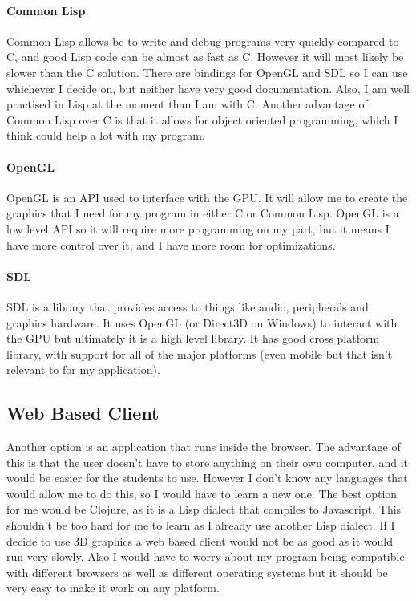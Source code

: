 \paragraph{Common Lisp} 
Common Lisp allows be to write and debug programs very quickly compared to C,
and good Lisp code can be almost as fast as C. However it will most likely be
slower than the C solution. There are bindings for OpenGL and SDL so I can use
whichever I decide on, but neither have very good documentation. Also, I am well
practised in Lisp at the moment than I am with C. Another advantage of Common
Lisp over C is that it allows for object oriented programming, which I think
could help a lot with my program.

\paragraph{OpenGL}
OpenGL is an API used to interface with the GPU. It will allow me to create the
graphics that I need for my program in either C or Common Lisp. OpenGL is a low
level API so it will require more programming on my part, but it means I have
more control over it, and I have more room for optimizations.

\paragraph{SDL}
SDL is a library that provides access to things like audio, peripherals and
graphics hardware. It uses OpenGL (or Direct3D on Windows) to interact with the
GPU but ultimately it is a high level library. It has good cross platform
library, with support for all of the major platforms (even mobile but that isn't
relevant to for my application).

\subsection{Web Based Client}
Another option is an application that runs inside the browser. The advantage of
this is that the user doesn't have to store anything on their own computer, and
it would be easier for the students to use. However I don't know any languages
that would allow me to do this, so I would have to learn a new one. The best
option for me would be Clojure, as it is a Lisp dialect that compiles to
Javascript. This shouldn't be too hard for me to learn as I already use another
Lisp dialect. If I decide to use 3D graphics a web based client would not be as
good as it would run very slowly. Also I would have to worry about my program
being compatible with different browsers as well as different operating systems
but it should be very easy to make it work on any platform. 
